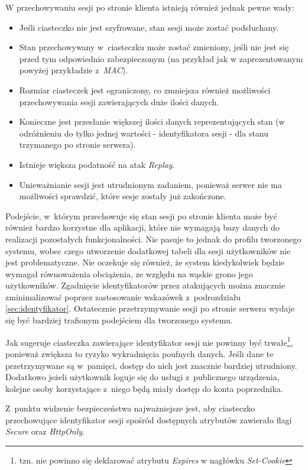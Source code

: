 \documentclass[11pt]{aghdpl}
\begin{document}
W przechowywaniu sesji po stronie klienta istnieją również jednak pewne wady:
\begin{itemize}
\item Jeśli ciasteczko nie jest szyfrowane, stan sesji może zostać podsłuchany.
\item Stan przechowywany w~ciasteczku może zostać zmieniony, jeśli nie jest się przed tym odpowiednio zabezpieczonym (na przykład jak w zaprezentowanym powyżej przykładzie z~\emph{MAC}).
\item Rozmiar ciasteczek jest ograniczony, co zmniejsza również możliwości przechowywania sesji zawierających duże ilości danych.
\item Konieczne jest przesłanie większej ilości danych reprezentujących stan (w odróżnieniu do tylko jednej wartości - identyfikatora sesji - dla stanu trzymanego po stronie serwera).
\item Istnieje większa podatność na atak \emph{Replay}.
\item Unieważnianie sesji jest utrudnionym zadaniem, ponieważ serwer nie ma możliwości sprawdzić, które sesje zostały już zakończone.
\end{itemize}

Podejście, w~którym przechowuje się stan sesji po stronie klienta może być również bardzo korzystne dla aplikacji, które nie wymagają bazy danych do realizacji pozostałych funkcjonalności. Nie pasuje to jednak do profilu tworzonego systemu, wobec czego utworzenie dodatkowej tabeli dla sesji użytkowników nie jest problematyczne. Nie oczekuje się również, że system kiedykolwiek będzie wymagał równoważenia obciążenia, ze względu na wąskie grono jego użytkowników. Zgadnięcie identyfikatorów przez atakujących można znacznie zminimalizować poprzez zastosowanie wskazówek z~podrozdziału \ref{sec:identyfikator}. Ostatecznie przetrzymywanie sesji po stronie serwera wydaje się być bardziej trafionym podejściem dla tworzonego systemu.

Jak sugeruje \cite{ClAu} ciasteczka zawierające identyfikator sesji nie powinny być trwałe\footnote{tzn. nie powinno się deklarować atrybutu \emph{Expires} w nagłówku \emph{Set-Cookie}}, ponieważ zwiększa to ryzyko wykradnięcia poufnych danych. Jeśli dane te przetrzymywane są w~pamięci, dostęp do nich jest znacznie bardziej utrudniony. Dodatkowo jeżeli użytkownik loguje się do usługi z~publicznego urządzenia, kolejne osoby korzystające z~niego będą miały dostęp do konta poprzednika.

Z~punktu widzenie bezpieczeństwa najważniejsze jest, aby ciasteczko przechowujące identyfikator sesji spośród dostępnych atrybutów zawierało flagi \emph{Secure} oraz \emph{HttpOnly}.
\end{document}
